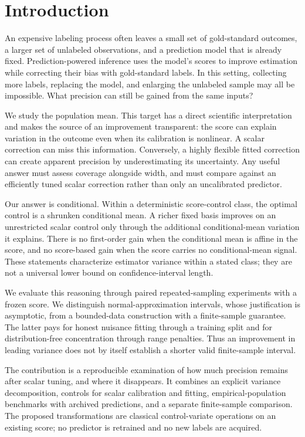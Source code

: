 \section{Introduction}\label{sec:intro}
An expensive labeling process often leaves a small set of gold-standard outcomes, a larger set of unlabeled observations, and a prediction model that is already fixed. Prediction-powered inference uses the model's scores to improve estimation while correcting their bias with gold-standard labels. In this setting, collecting more labels, replacing the model, and enlarging the unlabeled sample may all be impossible. What precision can still be gained from the same inputs?

We study the population mean. This target has a direct scientific interpretation and makes the source of an improvement transparent: the score can explain variation in the outcome even when its calibration is nonlinear. A scalar correction can miss this information. Conversely, a highly flexible fitted correction can create apparent precision by underestimating its uncertainty. Any useful answer must assess coverage alongside width, and must compare against an efficiently tuned scalar correction rather than only an uncalibrated predictor.

Our answer is conditional. Within a deterministic score-control class, the optimal control is a shrunken conditional mean. A richer fixed basis improves on an unrestricted scalar control only through the additional conditional-mean variation it explains. There is no first-order gain when the conditional mean is affine in the score, and no score-based gain when the score carries no conditional-mean signal. These statements characterize estimator variance within a stated class; they are not a universal lower bound on confidence-interval length.

We evaluate this reasoning through paired repeated-sampling experiments with a frozen score. We distinguish normal-approximation intervals, whose justification is asymptotic, from a bounded-data construction with a finite-sample guarantee. The latter pays for honest nuisance fitting through a training split and for distribution-free concentration through range penalties. Thus an improvement in leading variance does not by itself establish a shorter valid finite-sample interval.

The contribution is a reproducible examination of how much precision remains after scalar tuning, and where it disappears. It combines an explicit variance decomposition, controls for scalar calibration and fitting, empirical-population benchmarks with archived predictions, and a separate finite-sample comparison. The proposed transformations are classical control-variate operations on an existing score; no predictor is retrained and no new labels are acquired.

